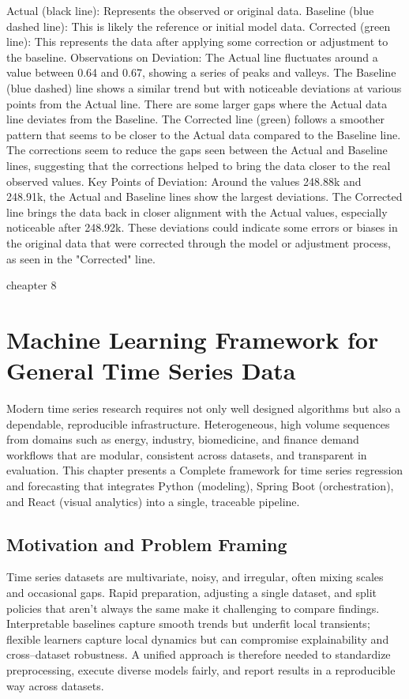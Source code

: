 Actual (black line): Represents the observed or original data.
Baseline (blue dashed line): This is likely the reference or initial model data.
Corrected (green line): This represents the data after applying some correction or adjustment to the baseline.
Observations on Deviation:
The Actual line fluctuates around a value between 0.64 and 0.67, showing a series of peaks and valleys.
The Baseline (blue dashed) line shows a similar trend but with noticeable deviations at various points from the Actual line. There are some larger gaps where the Actual data line deviates from the Baseline.
The Corrected line (green) follows a smoother pattern that seems to be closer to the Actual data compared to the Baseline line. The corrections seem to reduce the gaps seen between the Actual and Baseline lines, suggesting that the corrections helped to bring the data closer to the real observed values.
Key Points of Deviation:
Around the values 248.88k and 248.91k, the Actual and Baseline lines show the largest deviations.
The Corrected line brings the data back in closer alignment with the Actual values, especially noticeable after 248.92k.
These deviations could indicate some errors or biases in the original data that were corrected through the model or adjustment process, as seen in the "Corrected" line.




cheapter 8




\chapter{Machine Learning Framework for General Time Series Data}
\label{chap:ml_framework_timeseries}

Modern time series research requires not only well designed algorithms but also a dependable, reproducible infrastructure. Heterogeneous, high volume sequences from domains such as energy, industry, biomedicine, and finance demand workflows that are modular, consistent across datasets, and transparent in evaluation. This chapter presents a Complete framework for time series regression and forecasting that integrates Python (modeling), Spring Boot (orchestration), and React (visual analytics) into a single, traceable pipeline.

\section{Motivation and Problem Framing}
Time series datasets are multivariate, noisy, and irregular, often mixing scales and occasional gaps. Rapid preparation, adjusting a single dataset, and split policies that aren't always the same make it challenging to compare findings. Interpretable baselines capture smooth trends but underfit local transients; flexible learners capture local dynamics but can compromise explainability and cross–dataset robustness. A unified approach is therefore needed to standardize preprocessing, execute diverse models fairly, and report results in a reproducible way across datasets.

